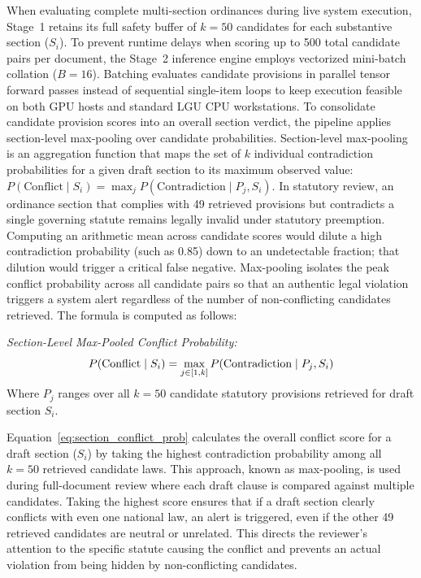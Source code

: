     When evaluating complete multi-section ordinances during live system execution, Stage~1 retains its full safety buffer of $k = 50$ candidates for each substantive section ($S_i$). To prevent runtime delays when scoring up to 500 total candidate pairs per document, the Stage~2 inference engine employs vectorized mini-batch collation ($B = 16$). Batching evaluates candidate provisions in parallel tensor forward passes instead of sequential single-item loops to keep execution feasible on both GPU hosts and standard LGU CPU workstations. To consolidate candidate provision scores into an overall section verdict, the pipeline applies section-level max-pooling over candidate probabilities. Section-level max-pooling is an aggregation function that maps the set of $k$ individual contradiction probabilities for a given draft section to its maximum observed value: $P(\text{Conflict} \mid S_i) = \max_{j} P(\text{Contradiction} \mid P_j, S_i)$. In statutory review, an ordinance section that complies with 49 retrieved provisions but contradicts a single governing statute remains legally invalid under statutory preemption. Computing an arithmetic mean across candidate scores would dilute a high contradiction probability (such as 0.85) down to an undetectable fraction; that dilution would trigger a critical false negative. Max-pooling isolates the peak conflict probability across all candidate pairs so that an authentic legal violation triggers a system alert regardless of the number of non-conflicting candidates retrieved. The formula is computed as follows:

    \noindent\textit{Section-Level Max-Pooled Conflict Probability:}
    \begin{equation}
        P(\text{Conflict} \mid S_i) = \max_{j \in [1, k]} P(\text{Contradiction} \mid P_j, S_i)
        \label{eq:section_conflict_prob}
        \eqcaption{Section-Level Max-Pooled Conflict Probability}
    \end{equation}
    \noindent Where $P_j$ ranges over all $k = 50$ candidate statutory provisions retrieved for draft section $S_i$.

    Equation~\ref{eq:section_conflict_prob} calculates the overall conflict score for a draft section ($S_i$) by taking the highest contradiction probability among all $k = 50$ retrieved candidate laws. This approach, known as max-pooling, is used during full-document review where each draft clause is compared against multiple candidates. Taking the highest score ensures that if a draft section clearly conflicts with even one national law, an alert is triggered, even if the other 49 retrieved candidates are neutral or unrelated. This directs the reviewer's attention to the specific statute causing the conflict and prevents an actual violation from being hidden by non-conflicting candidates.

